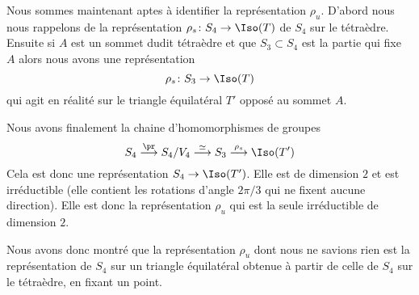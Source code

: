 \begin{normaltext}      \label{NORMooQQCYooILyOxc}
    Nous sommes maintenant aptes à identifier la représentation \( \rho_u\). D'abord nous nous rappelons de la représentation \( \rho_s\colon S_4\to \Iso(T)\) de \( S_4\) sur le tétraèdre. Ensuite si \( A\) est un sommet dudit tétraèdre et que \( S_3\subset S_4\) est la partie qui fixe \( A\) alors nous avons une représentation
    \begin{equation}
        \rho_s\colon S_3\to \Iso(T)
    \end{equation}
    qui agit en réalité sur le triangle équilatéral \( T'\) opposé au sommet \( A\).

    Nous avons finalement la chaine d'homomorphismes de groupes
    \begin{equation}
        S_4\stackrel{\pr}{\longrightarrow} S_4/V_4\stackrel{\simeq}{\longrightarrow} S_3\stackrel{\rho_s}{\longrightarrow}\Iso(T')
    \end{equation}
    Cela est donc une représentation \( S_4\to\Iso(T')\). Elle est de dimension \( 2\) et est irréductible (elle contient les rotations d'angle \( 2\pi/3\) qui ne fixent aucune direction). Elle est donc la représentation \( \rho_u\) qui est la seule irréductible de dimension \( 2\).

    Nous avons donc montré que la représentation \( \rho_u\) dont nous ne savions rien est la représentation de \( S_4\) sur un triangle équilatéral obtenue à partir de celle de \( S_4\) sur le tétraèdre, en fixant un point.
\end{normaltext}

